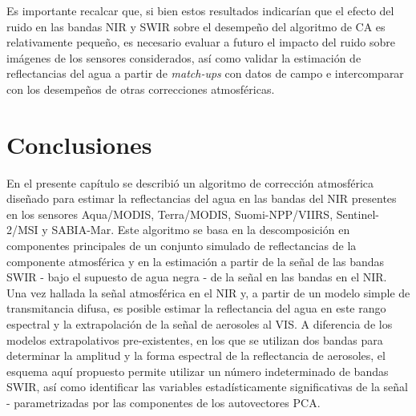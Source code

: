         Es importante recalcar que, si bien estos resultados indicarían que el efecto del ruido en las bandas NIR y SWIR sobre el desempeño del algoritmo de CA es relativamente pequeño, es necesario evaluar a futuro el impacto del ruido sobre imágenes de los sensores considerados, así como validar la estimación de reflectancias del agua a partir de \textit{match-ups} con datos de campo e intercomparar con los desempeños de otras correcciones atmosféricas.

\section{Conclusiones}
\label{pca:s:conclusiones}
    
    En el presente capítulo se describió un algoritmo de corrección atmosférica diseñado para estimar la reflectancias del agua en las bandas del NIR presentes en los sensores Aqua/MODIS, Terra/MODIS, Suomi-NPP/VIIRS, Sentinel-2/MSI y SABIA-Mar. Este algoritmo se basa en la descomposición en componentes principales de un conjunto simulado de reflectancias de la componente atmosférica y en la estimación a partir de la señal de las bandas SWIR - bajo el supuesto de agua negra - de la señal en las bandas en el NIR. Una vez hallada la señal atmosférica en el NIR y, a partir de un modelo simple de transmitancia difusa, es posible estimar la reflectancia del agua en este rango espectral y la extrapolación de la señal de aerosoles al VIS.
    A diferencia de los modelos extrapolativos pre-existentes, en los que se utilizan dos bandas para determinar la amplitud y la forma espectral de la reflectancia de aerosoles, el esquema aquí propuesto permite utilizar un número indeterminado de bandas SWIR, así como identificar las variables estadísticamente significativas de la señal - parametrizadas por las componentes de los autovectores PCA.
    
